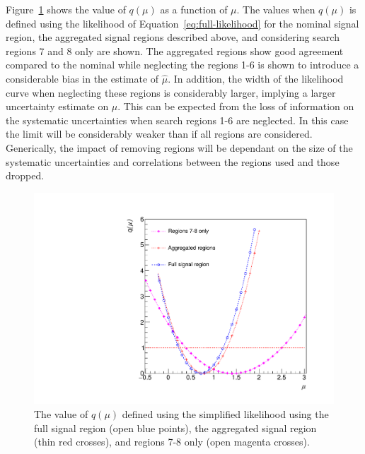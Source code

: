 Figure~\ref{fig:agg-likelihoodscan} shows the value of $q(\mu)$ as a function of $\mu$. The values when $q(\mu)$ 
is defined using the likelihood of Equation~\ref{eq:full-likelihood} for the nominal signal region, the aggregated signal
regions described above, and considering search regions 7 and 8 only are shown. The aggregated regions show
good agreement compared to the nominal while neglecting the regions 1-6 is shown to introduce a considerable
bias in the estimate of $\hat{\mu}$. In addition, the width of the likelihood curve when neglecting these regions is considerably
larger, implying a larger uncertainty estimate on $\mu$. This can be expected from the loss of information on
the systematic uncertainties when search regions 1-6 are neglected. In this case the limit will be considerably
weaker than if all regions are considered. Generically, the impact of removing regions
will be dependant on the size of the systematic uncertainties and correlations between the regions used and those
dropped.

\begin{figure}[hbt]
  \begin{center} 
   \includegraphics[width=1.5\cmsFigWidth]{figures/r_agg.pdf}
   \caption{The value of $q(\mu)$ defined using the simplified likelihood using the full signal region (open blue points), the aggregated signal region (thin red crosses),
   and regions 7-8 only (open magenta crosses).}
   \label{fig:agg-likelihoodscan} 
  \end{center}
\end{figure}
